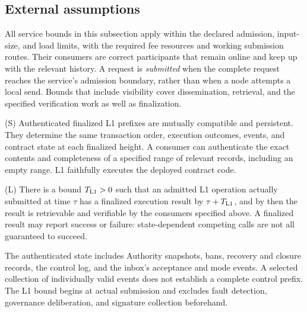 \subsection{External assumptions}
\label{sec:external-assumptions}

All service bounds in this subsection apply within the declared
admission, input-size, and load limits, with the required fee resources
and working submission routes.  Their consumers are correct
participants that remain online and keep up with the relevant history.
A request is \emph{submitted} when the complete request reaches the
service's admission boundary, rather than when a node attempts a local
send.  Bounds that include visibility cover dissemination, retrieval,
and the specified verification work as well as finalization.

\begin{assumption}
\label{ass:l1}
\textup{(S)} Authenticated finalized L1 prefixes are mutually compatible
and persistent.  They determine the same transaction order, execution
outcomes, events, and contract state at each finalized height.  A
consumer can authenticate the exact contents and completeness of a
specified range of relevant records, including an empty range.  L1
faithfully executes the deployed contract code.

\textup{(L)} There is a bound $T_{\rm L1}>0$ such that an admitted L1
operation actually submitted at time $\tau$ has a finalized execution
result by $\tau+T_{\rm L1}$, and by then the result is retrievable and
verifiable by the consumers specified above.  A finalized result may
report success or failure: state-dependent competing calls are not all
guaranteed to succeed.
\end{assumption}

The authenticated state includes Authority snapshots, bans, recovery and
closure records, the control log, and the inbox's acceptance and mode
events.  A selected collection of individually valid events does not
establish a complete control prefix.  The L1 bound begins at actual
submission and excludes fault detection, governance deliberation, and
signature collection beforehand.


